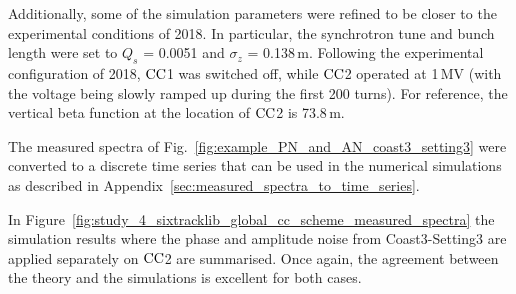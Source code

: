Additionally, some of the simulation parameters were refined to be closer to the experimental conditions of 2018. In particular, the synchrotron tune and bunch length were set to $Q_s$ = 0.0051 and $\sigma_z$ = 0.138\,m. Following the experimental configuration of 2018, ${\mathrm{CC}}$1 was switched off, while ${\mathrm{CC}}$2 operated at 1\,MV (with the voltage being slowly ramped up during the first 200 turns). For reference, the vertical beta function at the location of ${\mathrm{CC}}$2 is 73.8\,m.

The measured spectra of Fig.~\ref{fig:example_PN_and_AN_coast3_setting3} were converted to a discrete time series that can be used in the numerical simulations as described in Appendix~\ref{sec:measured_spectra_to_time_series}.

In Figure~\ref{fig:study_4_sixtracklib_global_cc_scheme_measured_spectra} the simulation results where the phase and amplitude noise from Coast3-Setting3 are applied separately on ${\mathrm{CC}}$2 are summarised. Once again, the agreement between the theory and the simulations is excellent for both cases.

